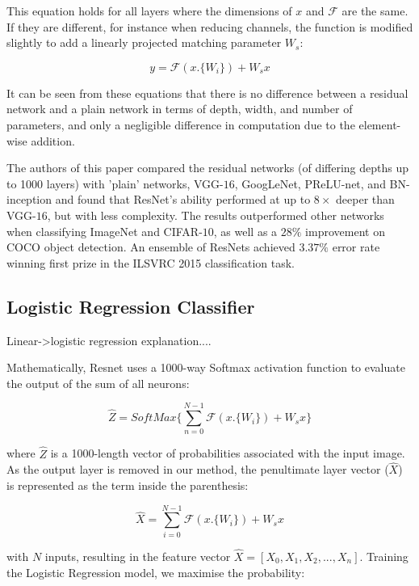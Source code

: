 \documentclass[conference]{IEEEtran}
\begin{document}
This equation holds for all layers where the dimensions of $x$ and $\mathcal{F}$ are the same. If they are different, for instance when reducing channels, the function is modified slightly to add a linearly projected matching parameter $W_s$:

\begin{equation}
    y = \mathcal{F}(x.\{W_i\}) + W_s x
\end{equation}

It can be seen from these equations that there is no difference between a residual network and a plain network in terms of depth, width, and number of parameters, and only a negligible difference in computation due to the element-wise addition.

The authors of this paper \cite{He} compared the residual networks (of differing depths up to 1000 layers) with 'plain' networks, VGG-$16$, GoogLeNet, PReLU-net, and BN-inception and found that ResNet's ability performed at up to $8\times$ deeper than VGG-$16$, but with less complexity. The results outperformed other networks when classifying ImageNet and CIFAR-$10$, as well as a $28\%$ improvement on COCO object detection. An ensemble of ResNets achieved $3.37\%$ error rate winning first prize in the ILSVRC 2015 classification task.


\subsection{Logistic Regression Classifier}

Linear->logistic regression explanation....


Mathematically, Resnet uses a 1000-way Softmax activation function to evaluate the output of the sum of all neurons:

\begin{equation}
\hat{Z} = SoftMax\Bigg \{ \sum_{n=0}^{N-1} \mathcal{F}(x.\{W_i\}) + W_s x \Bigg \}
\end{equation}

where $\hat{Z}$ is a 1000-length vector of probabilities associated with the input image. As the output layer is removed in our method, the penultimate layer vector ($\hat{X}$) is represented as the term inside the parenthesis:

\begin{equation}
\hat{X} = \sum_{i=0}^{N-1} \mathcal{F}(x.\{W_i\}) + W_s x
\end{equation}

with $N$ inputs, resulting in the feature vector $\hat{X}=[X_0, X_1, X_2,..., X_n]$. Training the Logistic Regression model, we maximise the probability:
\end{document}
